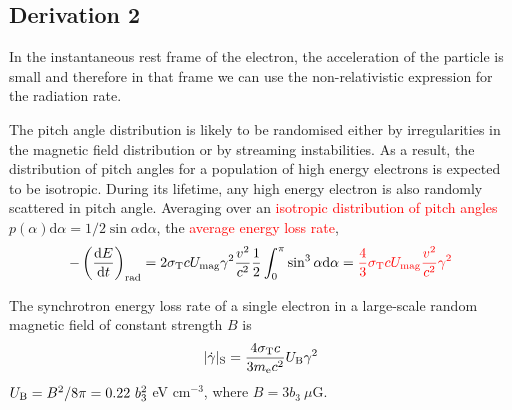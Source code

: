 \documentclass[12pt,a4paper]{article}
\newcommand{\dif}{\mathrm{d}}
\begin{document}
\subsection{Derivation 2}
In the instantaneous rest frame of the electron, the acceleration of the particle is small and therefore in that frame we can use the non-relativistic expression for the radiation rate. 

The pitch angle distribution is likely to be randomised either by irregularities in the magnetic field distribution or by streaming instabilities. As a result, the distribution of pitch angles for a population of high energy electrons is expected to be isotropic. During its lifetime, any high energy electron is also randomly scattered in pitch angle. Averaging over an \textcolor{red}{isotropic distribution of pitch angles} $p(\alpha) \dif \alpha = 1/2 \sin \alpha \dif \alpha$, the \textcolor{red}{average energy loss rate},
\begin{eqnarray}
 -\left(\frac{\dif E}{\dif t} \right)_{\rm rad} = 2\sigma_{\rm T} c U_{\rm mag} \gamma^2 \frac{v^2}{c^2} \frac{1}{2} \int_0^{\pi} \sin^3 \alpha \dif \alpha = \textcolor{red}{\frac{4}{3} \sigma_{\rm T} c U_{\rm mag} \frac{v^2}{c^2} \gamma^2}
\end{eqnarray}


The synchrotron energy loss rate of a single electron in a large-scale random magnetic field of
constant strength $B$ is
\begin{equation}
|\dot{\gamma}|_{\rm S} = \frac{4\sigma_{\rm T} c}{3m_{\rm e} c^2} U_{\rm B} \gamma^2
\end{equation}
$U_{\rm B} = B^2/8\pi = 0.22 ~b_3^2$ eV cm$^{-3}$, where $B = 3 b_3 ~\mu$G.












\end{document}
